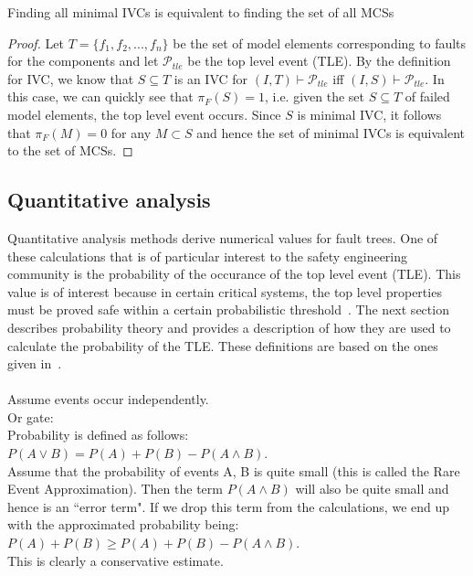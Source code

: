 \begin{theorem} Finding all minimal IVCs is equivalent to finding the set of all MCSs\\
\begin{proof} Let $T = \{f_1, f_2, ..., f_n\}$ be the set of model elements corresponding to faults for the components and let $\mathcal{P}_{tle}$ be the top level event (TLE). By the definition for IVC, we know that $S \subseteq T$ is an IVC for $(I, T) \vdash \mathcal{P}_{tle}$ iff $(I, S) \vdash \mathcal{P}_{tle}$. 
In this case, we can quickly see that $\pi_F(S) = 1$, i.e. given the set $S \subseteq T$ of failed model elements, the top level event occurs. 
Since $S$ is minimal IVC, it follows that $\pi_F(M) = 0$ for any $M \subset S$ and hence the set of minimal IVCs is equivalent to the set of MCSs. 
\end{proof}
\end{theorem}

\subsection{Quantitative analysis}
Quantitative analysis methods derive numerical values for fault trees. One of these calculations that is of particular interest to the safety engineering community is the probability of the occurance of the top level event (TLE). This value is of interest because in certain critical systems, the top level properties must be proved safe within a certain probabilistic threshold~\cite{SAE:ARP4761}. The next section describes probability theory and provides a description of how they are used to calculate the probability of the TLE. These definitions are based on the ones given in~\cite{RuijtersSurvey}.\\

\\
Assume events occur independently. \\

Or gate: \\
Probability is defined as follows: \\
$P(A \lor B) = P(A) + P(B) - P(A \land B)$. \\
Assume that the probability of events A, B is quite small (this is called the Rare Event Approximation). Then the term $P(A \land B)$ will also be quite small and hence is an ``error term". If we drop this term from the calculations, we end up with the approximated probability being: $P(A) + P(B) \geq P(A) + P(B) - P(A \land B)$. \\ This is clearly a conservative estimate. 

